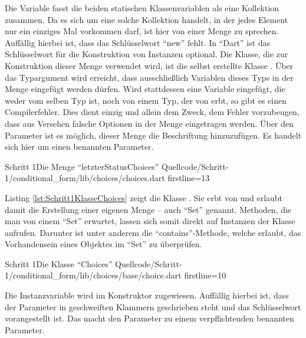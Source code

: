 \clearpage
Die Variable   fasst die beiden statischen Klassenvariablen als eine Kollektion zusammen.
Da es sich um eine solche Kollektion handelt, in der jedes Element nur ein einziges Mal vorkommen darf, ist hier von einer Menge zu sprechen.
Auffällig hierbei ist, dass das Schlüsselwort \enquote{new} fehlt.
In \enquote{Dart} ist das Schlüsselwort für die Konstruktion von Instanzen optional.
Die Klasse, die zur Konstruktion dieser Menge verwendet wird, ist die selbst erstellte Klasse .
Über das Typargument  wird erreicht, dass ausschließlich Variablen  dieses Typs in der Menge eingefügt werden dürfen.
Wird stattdessen eine Variable eingefügt, die weder vom selben Typ ist, noch von einem Typ, der von  erbt, so gibt es einen Compilerfehler.
Dies dient einzig und allein dem Zweck, dem  Fehler vorzubeugen, dass aus Versehen falsche Optionen in der Menge eingetragen werden.
Über den Parameter  ist es möglich, dieser Menge die Beschriftung  hinzuzufügen.
 Es handelt sich hier um einen  benannten Parameter.

\begin{alexlisting}{Schritt 1}{Die Menge \enquote{letzterStatusChoices}}
  {Quellcode/Schritt-1/conditional_form/lib/choices/choices.dart}
  {firstline=13}
  \label{lst:Schritt1DieMengeLetzterStatusChoices}
\end{alexlisting}

Listing \ref{lst:Schritt1KlasseChoices} zeigt die Klasse .
Sie erbt von  und erlaubt damit die Erstellung  einer eigenen Menge -- auch \enquote{Set} genannt.
Methoden, die man von einem \enquote{Set} erwartet,  lassen sich somit direkt auf  Instanzen der Klasse  aufrufen.
Darunter ist unter anderem die \enquote{contains}-Methode,  welche erlaubt, das Vorhandensein eines Objektes im \enquote{Set} zu überprüfen.

\begin{alexlisting}{Schritt 1}{Die Klasse \enquote{Choices}}
  {Quellcode/Schritt-1/conditional_form/lib/choices/base/choice.dart}
  {firstline=10}
  \label{lst:Schritt1KlasseChoices}
\end{alexlisting}

Die Instanzvariable   wird im Konstruktor  zugewiesen.
Auffällig hierbei ist, dass der Parameter in geschweiften Klammern geschrieben steht und das Schlüsselwort   vorangestellt ist.
Das macht den Parameter zu einem verpflichtenden benannten Parameter.

